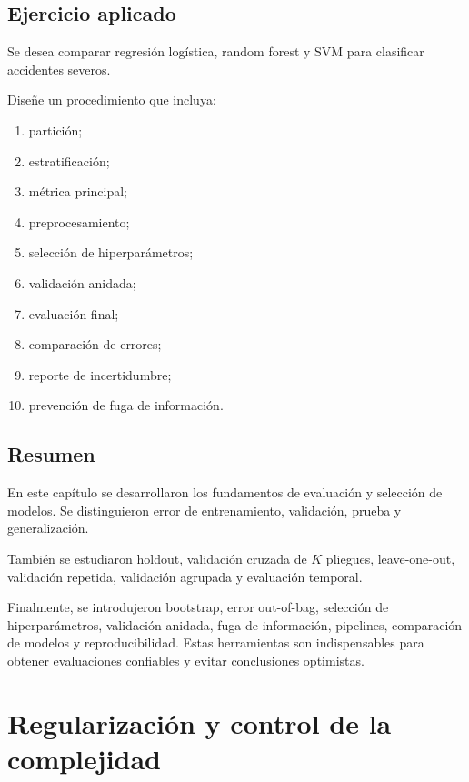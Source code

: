 \documentclass[
  spanish,
  11pt,
  letterpaper,
  DIV=11,
  numbers=noendperiod]{scrreprt}
\providecommand{\tightlist}{%
  \setlength{\itemsep}{0pt}\setlength{\parskip}{0pt}}
\theoremstyle{definition}
\theoremstyle{plain}
\theoremstyle{definition}
\theoremstyle{remark}
\begin{document}
\section{Ejercicio aplicado}\label{ejercicio-aplicado-4}

Se desea comparar regresión logística, random forest y SVM para
clasificar accidentes severos.

Diseñe un procedimiento que incluya:

\begin{enumerate}
\def\labelenumi{\arabic{enumi}.}
\tightlist
\item
  partición;
\item
  estratificación;
\item
  métrica principal;
\item
  preprocesamiento;
\item
  selección de hiperparámetros;
\item
  validación anidada;
\item
  evaluación final;
\item
  comparación de errores;
\item
  reporte de incertidumbre;
\item
  prevención de fuga de información.
\end{enumerate}

\section{Resumen}\label{resumen-6}

En este capítulo se desarrollaron los fundamentos de evaluación y
selección de modelos. Se distinguieron error de entrenamiento,
validación, prueba y generalización.

También se estudiaron holdout, validación cruzada de \(K\) pliegues,
leave-one-out, validación repetida, validación agrupada y evaluación
temporal.

Finalmente, se introdujeron bootstrap, error out-of-bag, selección de
hiperparámetros, validación anidada, fuga de información, pipelines,
comparación de modelos y reproducibilidad. Estas herramientas son
indispensables para obtener evaluaciones confiables y evitar
conclusiones optimistas.

\chapter{Regularización y control de la
complejidad}\label{sec-regularizacion}
\end{document}
